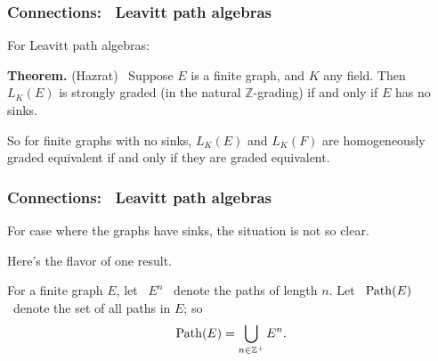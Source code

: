 \documentclass{beamer}
\begin{document}
\begin{frame}
\frametitle{Connections: \ Leavitt path algebras}

For Leavitt path algebras:  

\bigskip

{\bf Theorem.}   (Hazrat)    \ Suppose $E$ is a finite graph, and $K$ any field.   Then $L_K(E)$ is strongly graded (in the natural $\mathbb{Z}$-grading)   if and only if $E$ has no sinks.    

\bigskip

So for finite graphs with no sinks, $L_K(E)$ and $L_K(F)$ are homogeneously graded equivalent if and only if they are graded equivalent.  



\end{frame}


\begin{frame}
\frametitle{Connections: \ Leavitt path algebras}


For case where the graphs have sinks, the situation is not so clear.

\bigskip

Here's the flavor of one result.  

\bigskip

  

For a finite graph $E$, let \ 
$E^n$ \ denote the paths of length $n$.   Let  
 \ ${\rm Path}(E)$ \  denote the set of all paths in $E$; so  $${\rm Path}(E) = \bigcup_{n\in \mathbb{Z}^{+}} E^n.$$  









\end{frame}
\end{document}
